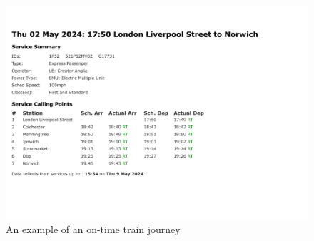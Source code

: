 \begin{figure}[!htbp]
    \includegraphics[trim=0 80 0 0]{Diagrams/Exmple of train times/On-Time/Service Information_02-05-24.pdf}
    \caption[short]{An example of an on-time train journey}
    \label{fig: real on-time train times}
\end{figure}

